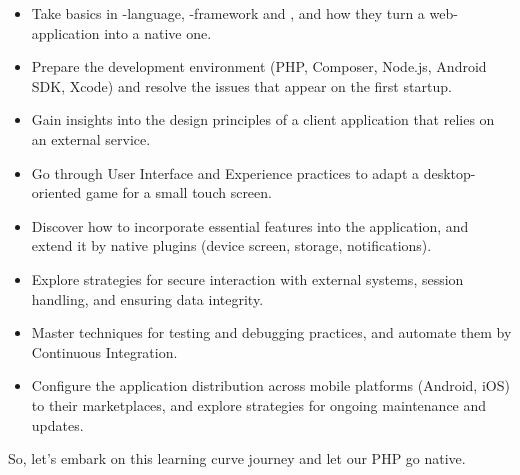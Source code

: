 \begin{itemize}
\setlength{\itemsep}{3pt}
\setlength{\parskip}{0pt}
\setlength{\parsep}{0pt}
  \item Take basics in -language, -framework and , and how they
  turn a web-application into a native one.

  \item Prepare the development environment (PHP, Composer, Node.js, Android SDK, Xcode) and
  resolve the issues that appear on the first startup.

  \item Gain insights into the design principles of a client application that relies on an
  external service.

  \item Go through User Interface and Experience practices to adapt a desktop-oriented game for
  a small touch screen.

  \item Discover how to incorporate essential features into the application, and extend it by
  native plugins (device screen, storage, notifications).

  \item Explore strategies for secure interaction with external systems, session handling, and
  ensuring data integrity.

  \item Master techniques for testing and debugging practices, and automate them by Continuous
  Integration.

  \item Configure the application distribution across mobile platforms (Android, iOS) to their
  marketplaces, and explore strategies for ongoing maintenance and updates.
\end{itemize}

\noindent So, let's embark on this learning curve journey and let our PHP go native.
